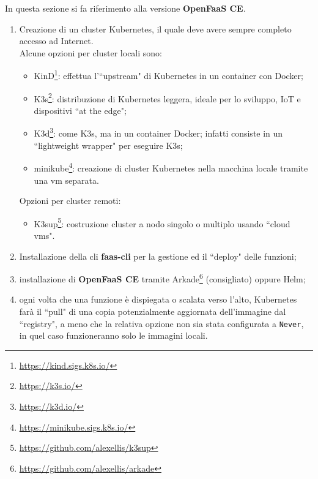 \documentclass[12pt,a4paper,openany,twoside]{book}
\begin{document}
In questa sezione si fa riferimento alla versione \textbf{OpenFaaS CE}.
\begin{enumerate}
    \item Creazione di un cluster Kubernetes, il quale deve avere sempre completo accesso ad Internet.
    \\
    Alcune opzioni per cluster locali sono:
    \begin{itemize}
        \item KinD\footnote{\url{https://kind.sigs.k8s.io/}}: effettua l'``upstream" di Kubernetes in un container con Docker;
        
        \item K3s\footnote{\url{https://k3s.io/}}: distribuzione di Kubernetes leggera, ideale per lo sviluppo, \ac{IoT} e dispositivi ``at the edge";
        
        \item K3d\footnote{\url{https://k3d.io/}}: come K3s, ma in un container Docker; infatti consiste in un ``lightweight wrapper" per eseguire K3s;
        
        \item minikube\footnote{\url{https://minikube.sigs.k8s.io/}}: creazione di cluster Kubernetes nella macchina locale tramite una \ac{vm} separata.
    \end{itemize}

    Opzioni per cluster remoti:
    \begin{itemize}
        \item K3sup\footnote{\url{https://github.com/alexellis/k3sup}}: costruzione cluster a nodo singolo o multiplo usando ``cloud \acp{vm}".
    \end{itemize}
    
    \item Installazione della \ac{cli} \textbf{faas-cli} per la gestione ed il ``deploy" delle funzioni;
    
    \item installazione di \textbf{OpenFaaS CE} tramite Arkade\footnote{\url{https://github.com/alexellis/arkade}} (consigliato) oppure Helm;
    
    \item ogni volta che una funzione è dispiegata o scalata verso l'alto, Kubernetes farà il ``pull" di una copia potenzialmente aggiornata dell'immagine dal ``registry", a meno che la relativa opzione non sia stata configurata a \texttt{Never}, in quel caso funzioneranno solo le immagini locali.
\end{enumerate}
\end{document}
